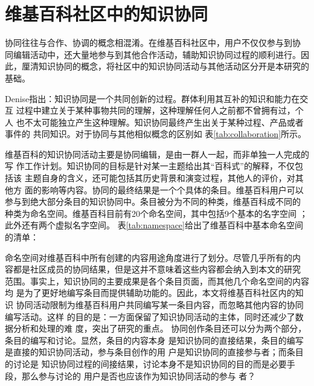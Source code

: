 \section{维基百科社区中的知识协同}
协同往往与合作、协调的概念相混淆。在维基百科社区中，用户不仅仅参与到协
同编辑活动中，还大量地参与到其他合作活动，辅助知识协同过程的顺利进行。因
此，厘清知识协同的概念，将社区中的知识协同活动与其他活动区分开是本研究的基础。

Denise指出：知识协同是一个共同创新的过程。群体利用其互补的知识和能力在交互
过程中建立关于某种事物共同的理解，这种理解任何人之前都不曾拥有过，个人
也不太可能独立产生这种理解。知识协同最终产生出关于某种过程、产品或者事件的
共同知识\cite{denise1999collaboration}。对于协同与其他相似概念的区别如
表\ref{tab:collaboration}所示。


维基百科的知识协同活动主要是协同编辑，是由一群人一起，而非单独一人完成的写
作工作计划。知识协同的目标是针对某一主题给出其“百科式”的解释，不仅包括该
主题自身的含义，还可能包括其历史背景和演变过程，其他人的评价，对其他方
面的影响等内容。协同的最终结果是一个个具体的条目。维基百科用户可以
参与到绝大部分条目的知识协同中。条目被分为不同的种类，维基百科成不同的
种类为命名空间。维基百科目前有20个命名空间，其中包括9个基本的名字空间
；此外还有两个虚拟名字空间。
表\ref{tab:namespace}给出了维基百科中基本命名空间的清单：


命名空间对维基百科中所有创建的内容用途角度进行了划分。尽管几乎所有的内
容都是社区成员的协同结果，但是这并不意味着这些内容都会纳入到本文的研究
范围。事实上，知识协同的主要成果是各个条目页面，而其他几个命名空间的内容均
是为了更好地编写条目而提供辅助功能的。因此，本文将维基百科社区内的知识
协同活动限制为维基百科用户共同编写某一条目内容，而忽略其他内容的协同编写活动。这样
的目的是：一方面保留了知识协同活动的主体，同时还减少了数据分析和处理的难
度，突出了研究的重点。
协同创作条目还可以分为两个部分，条目的编写和讨论。显然，条目的内容本身
是知识协同的直接结果，条目的编写是直接的知识协同活动，参与条目创作的用
户是知识协同的直接参与者；而条目的讨论是
知识协同过程的间接结果，讨论本身不是知识协同的目的而是必要手段，那么参与讨论的
用户是否也应该作为知识协同活动的参与
者？

